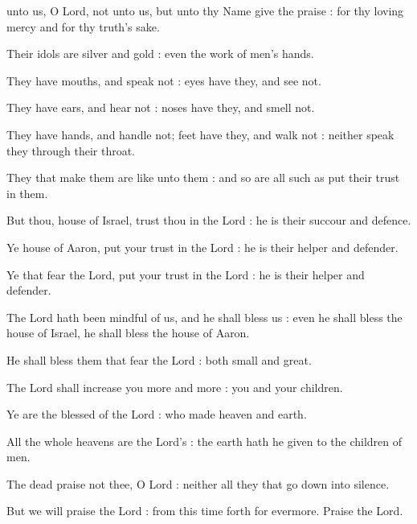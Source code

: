  unto us, O Lord, not unto us, but unto thy Name give the praise : for thy loving mercy and for thy truth's sake.\par
{}
Their idols are silver and gold : even the work of men's hands.\par
{}They have mouths, and speak not : eyes have they, and see not.\par
{}They have ears, and hear not : noses have they, and smell not.\par
{}They have hands, and handle not; feet have they, and walk not : neither speak they through their throat.\par
{}They that make them are like unto them : and so are all such as put their trust in them.\par
{}But thou, house of Israel, trust thou in the Lord : he is their succour and defence.\par
{}Ye house of Aaron, put your trust in the Lord : he is their helper and defender.\par
{}Ye that fear the Lord, put your trust in the Lord : he is their helper and defender.\par
{}The Lord hath been mindful of us, and he shall bless us : even he shall bless the house of Israel, he shall bless the house of Aaron.\par
{}He shall bless them that fear the Lord : both small and great.\par
{}The Lord shall increase you more and more : you and your children.\par
{}Ye are the blessed of the Lord : who made heaven and earth.\par
{}All the whole heavens are the Lord's : the earth hath he given to the children of men.\par
{}The dead praise not thee, O Lord : neither all they that go down into silence.\par
{}But we will praise the Lord : from this time forth for evermore. Praise the Lord.\par



